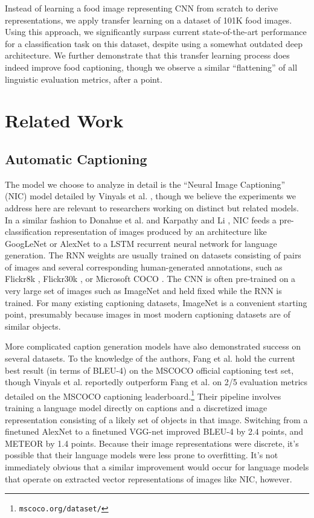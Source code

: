 \documentclass[11pt]{article}
\begin{document}
Instead of learning a food image representing CNN from scratch to
derive representations, we apply transfer learning on a dataset of
101K food images. Using this approach, we significantly surpass
current state-of-the-art performance for a classification task on this
dataset, despite using a somewhat outdated deep architecture. We
further demonstrate that this transfer learning process does indeed
improve food captioning, though we observe a similar ``flattening'' of
all linguistic evaluation metrics, after a point.

\section{Related Work}

\subsection{Automatic Captioning}
The model we choose to analyze in detail is the ``Neural Image
Captioning'' (NIC) model detailed by Vinyals et
al. , though we believe the experiments we
address here are relevant to researchers working on distinct but
related models. In a similar fashion to Donahue et
al.  and Karpathy and Li
, NIC feeds a pre-classification
representation of images produced by an architecture like GoogLeNet
\cite{szegedy2014going} or AlexNet \cite{alexnet} to a LSTM recurrent
neural network \cite{hochreiter1997long} for language generation. The
RNN weights are usually trained on datasets consisting of pairs of
images and several corresponding human-generated annotations, such as
Flickr8k \cite{hodosh2013framing}, Flickr30k \cite{young2014image}, or
Microsoft COCO \cite{lin2014microsoft}. The CNN is often pre-trained
on a very large set of images such as ImageNet \cite{deng2009imagenet}
and held fixed while the RNN is trained. For many existing captioning
datasets, ImageNet is a convenient starting point, presumably because
images in most modern captioning datasets are of similar objects.

More complicated caption generation models have also demonstrated
success on several datasets. To the knowledge of the authors, Fang et
al.  hold the current best result (in
terms of BLEU-4) on the MSCOCO official captioning test set, though
Vinyals et al.  reportedly outperform Fang
et al. on 2/5 evaluation metrics detailed on the MSCOCO captioning
leaderboard.\footnote{\texttt{mscoco.org/dataset/}} Their pipeline
involves training a language model directly on captions and a
discretized image representation consisting of a likely set of objects
in that image. Switching from a finetuned AlexNet \cite{alexnet} to a
finetuned VGG-net \cite{simonyan2014very} improved BLEU-4 by 2.4
points, and METEOR by 1.4 points. Because their image representations
were discrete, it's possible that their language models were less prone
to overfitting. It's not immediately obvious that a similar
improvement would occur for language models that operate on extracted
vector representations of images like NIC, however.
\end{document}
